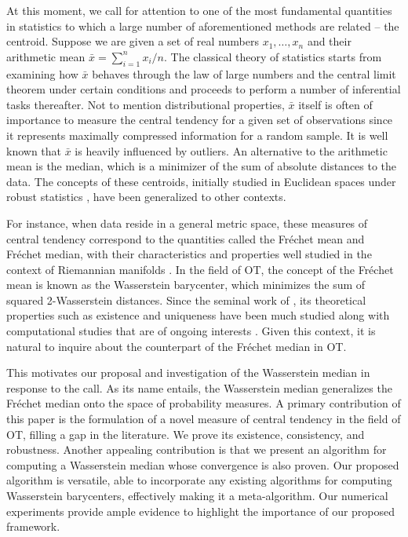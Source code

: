 \documentclass[11pt]{article}
\newcommand{\Frechet}{Fr\'{e}chet }
\begin{document}
At this moment, we call for attention to one of the most fundamental quantities in statistics to which a large number of aforementioned methods are related -- the centroid.  Suppose we are given a set of real numbers $x_1, \ldots, x_n$ and their arithmetic mean $\bar{x} = \sum_{i=1}^n x_i/n$. The classical theory of statistics starts from examining how $\bar{x}$ behaves through the law of large numbers and the central limit theorem under certain conditions and proceeds to perform a number of inferential tasks thereafter. Not to mention distributional properties, $\bar{x}$ itself is often of importance to measure the central tendency for a given set of observations since it represents maximally compressed information for a random sample. It is well known that $\bar{x}$ is
heavily influenced by outliers. An alternative to the arithmetic mean   is the median, which is a minimizer of the sum of absolute distances to the data. The concepts of these centroids, initially studied in Euclidean spaces under robust statistics  \citep{huber_1981_RobustStatistics}, have been generalized to other contexts.


For instance, when data reside in a general metric space, these measures of central tendency correspond to the quantities called the \Frechet mean and \Frechet median, with their characteristics and properties well studied in the context of Riemannian manifolds \citep{kendall_1990_ProbabilityConvexityHarmonic, pennec_2006_IntrinsicStatisticsRiemannian, afsari_2011_RiemannianCenterMass, bhattacharya_2012_NonparametricInferenceManifolds}. In the field of OT, the concept of the  \Frechet mean is known as the Wasserstein barycenter, which minimizes the sum of squared 2-Wasserstein distances. Since the seminal work of \cite{agueh_2011_BarycentersWassersteinSpace}, its theoretical properties such as existence and uniqueness have been much studied along with computational studies that are of ongoing interests \citep{cuturi_2014_FastComputationWasserstein, dvurechenskii_2018_DecentralizeRandomizeFaster, claici_2018_StochasticWassersteinBarycenters, li_2020_ContinuousRegularizedWasserstein,xie_2020_FastProximalPoint, korotin_2021_ContinuousWasserstein2Barycenter}. Given this context, it is natural to inquire about the counterpart of the \Frechet median in OT.



This motivates our proposal and investigation of the Wasserstein median in response to the call. As its name entails, the Wasserstein median generalizes the \Frechet median onto the space of probability measures. A primary contribution of this paper is the formulation of a novel measure of central tendency in the field of OT, filling a gap in the literature. We prove its existence, consistency, and robustness. Another appealing contribution is that we present an algorithm for computing a Wasserstein median whose convergence is also proven. Our proposed algorithm is versatile, able to incorporate any existing algorithms for computing Wasserstein barycenters, effectively making it a meta-algorithm. Our numerical experiments provide ample evidence to highlight the importance of our proposed framework.
\end{document}
